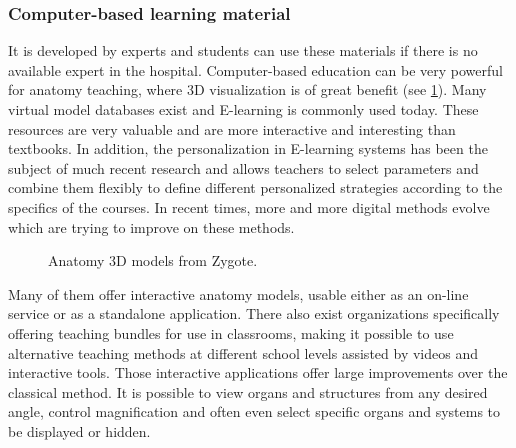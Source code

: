 \subsubsection{Computer-based learning material} 
It is developed by experts and students can use these materials if there is no available expert in the hospital. Computer-based education can be very powerful for anatomy teaching, where 3D visualization is of great benefit (see \figurename{\ref{fig:2-bg:zygote-body-esplorazione}}). Many virtual model databases exist and E-learning is commonly used today. These resources are very valuable and are more interactive and interesting than textbooks. 
In addition, the personalization in E-learning systems has been the subject of much recent research and allows teachers to select parameters and combine them flexibly to define different personalized strategies according to the specifics of the courses. In recent times, more and more digital methods evolve which are trying to improve on these methods. 
\begin{figure}
\centering
{}
\qquad
{}
\caption{Anatomy 3D models from Zygote\protect\footnotemark.}
\label{fig:2-bg:zygote-body-esplorazione}
\end{figure}
Many of them offer interactive anatomy models, usable either as an on-line service or as a standalone application. There also exist organizations specifically offering teaching bundles for use in classrooms, making it possible to use alternative teaching methods at different school levels assisted by videos and interactive tools. Those interactive applications offer large improvements over the classical method. It is possible to view organs and structures from any desired angle, control magnification and often even select specific organs and systems to be displayed or hidden. 
